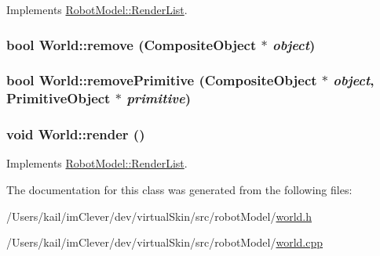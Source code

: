 Implements \hyperlink{class_robot_model_1_1_render_list_a78436c997913ce9ad41a9bd1da9b3d96}{RobotModel::RenderList}.\hypertarget{class_robot_model_1_1_world_a40f4e4bfed5121602f993bf561932b07}{
\subsubsection[{remove}]{\setlength{\rightskip}{0pt plus 5cm}bool World::remove ({\bf CompositeObject} $\ast$ {\em object})}}
\label{class_robot_model_1_1_world_a40f4e4bfed5121602f993bf561932b07}
\hypertarget{class_robot_model_1_1_world_a498c5d79bc95bd308680c2a8c5e475b0}{
\subsubsection[{removePrimitive}]{\setlength{\rightskip}{0pt plus 5cm}bool World::removePrimitive ({\bf CompositeObject} $\ast$ {\em object}, \/  {\bf PrimitiveObject} $\ast$ {\em primitive})}}
\label{class_robot_model_1_1_world_a498c5d79bc95bd308680c2a8c5e475b0}
\hypertarget{class_robot_model_1_1_world_a150eab10c21532162bb698d72aecec16}{
\subsubsection[{render}]{\setlength{\rightskip}{0pt plus 5cm}void World::render ()}}
\label{class_robot_model_1_1_world_a150eab10c21532162bb698d72aecec16}


Implements \hyperlink{class_robot_model_1_1_render_list_ac8646765beee22bf11582049dc3cf195}{RobotModel::RenderList}.

The documentation for this class was generated from the following files:\begin{DoxyCompactItemize}
\item 
/Users/kail/imClever/dev/virtualSkin/src/robotModel/\hyperlink{world_8h}{world.h}\item 
/Users/kail/imClever/dev/virtualSkin/src/robotModel/\hyperlink{world_8cpp}{world.cpp}\end{DoxyCompactItemize}
